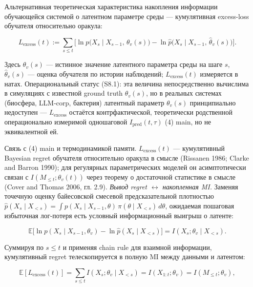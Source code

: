 \documentclass[pdflatex,sn-mathphys-ay]{sn-jnl}
\providecommand{\lt}{<}\providecommand{\gt}{>}
\begin{document}
Альтернативная теоретическая характеристика накопления информации обучающейся системой о латентном параметре среды --- кумулятивная excess-loss обучателя относительно оракула:



\begin{equation}L_{\text{excess}}(t) := \sum_{s \le t} \bigl[ \ln p\bigl(X_s \mid X_{s-1},\, \theta_v(s)\bigr) - \ln \hat p\bigl(X_s \mid X_{s-1},\, \hat\theta_v(s)\bigr) \bigr]. \tag{S8.1}\end{equation}



Здесь \(\theta_v(s)\) --- истинное значение латентного параметра среды на шаге \(s\), \(\hat\theta_v(s)\) --- оценка обучателя по истории наблюдений; \(L_{\text{excess}}(t)\) измеряется в натах. Операциональный статус (S8.1): эта величина непосредственно вычислима в симуляциях с известной ground truth \(\theta_v(s)\), но в реальных системах (биосфера, LLM-corp, бактерия) латентный параметр \(\theta_v(s)\) принципиально недоступен --- \(L_{\text{excess}}\) остаётся контрфактической, теоретически родственной операционально измеримой одношаговой \(I_{\text{pred}}(t,\tau)\) (4) main, но не эквивалентной ей.



Связь с (4) main и термодинамикой памяти. \(L_{\text{excess}}(t)\) --- кумулятивный Bayesian regret обучателя относительно оракула в смысле (Rissanen 1986; Clarke and Barron 1990); для регулярных параметрических моделей он асимптотически связан с \(I(M_{\le t}; \theta_v(t))\) через теорему о достаточной статистике в смысле (Cover and Thomas 2006, гл. 2.9). \emph{Вывод regret \(\leftrightarrow\) накопленная MI.} Заменяя точечную оценку байесовской смесевой предсказательной плотностью \(\hat p(X_s\mid X_{\lt s}) = \int p(X_s\mid X_{s-1},\theta)\, \pi(\theta\mid X_{\lt s})\,d\theta\), ожидаемая пошаговая избыточная лог-потеря есть условный информационный выигрыш о латенте:



\[\mathbb{E}\bigl[\ln p(X_s\mid X_{s-1},\theta_v) - \ln \hat p(X_s\mid X_{\lt s})\bigr] = I(X_s;\theta_v\mid X_{\lt s}).\]



Суммируя по \(s \le t\) и применяя chain rule для взаимной информации, кумулятивный regret телескопируется в полную MI между данными и латентом:



\[\mathbb{E}[L_{\text{excess}}(t)] = \sum_{s\le t} I(X_s;\theta_v\mid X_{\lt s}) = I(X_{1:t};\theta_v) = I(M_{\le t};\theta_v),\]
\end{document}
